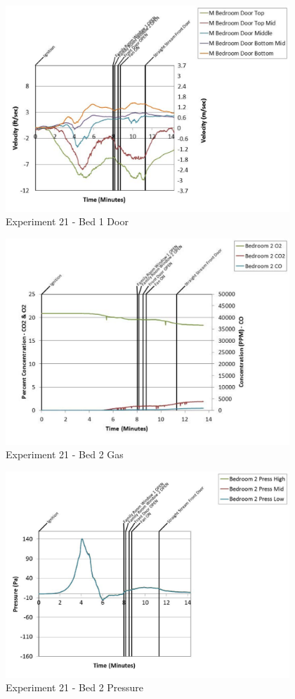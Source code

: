 \documentclass{article}
\begin{document}
\begin{appendices}
	\clearpage

	\begin{figure}[h!]
		\centering
		\includegraphics[height=3.05in]{0_Images/Results_Charts/Exp_21_Charts/Bed1Door.pdf}
		\caption{Experiment 21 - Bed 1 Door}
	\end{figure}
 

	\begin{figure}[h!]
		\centering
		\includegraphics[height=3.05in]{0_Images/Results_Charts/Exp_21_Charts/Bed2Gas.pdf}
		\caption{Experiment 21 - Bed 2 Gas}
	\end{figure}
 
	\clearpage

	\begin{figure}[h!]
		\centering
		\includegraphics[height=3.05in]{0_Images/Results_Charts/Exp_21_Charts/Bed2Pressure.pdf}
		\caption{Experiment 21 - Bed 2 Pressure}
	\end{figure}
 


\end{appendices}
\end{document}
